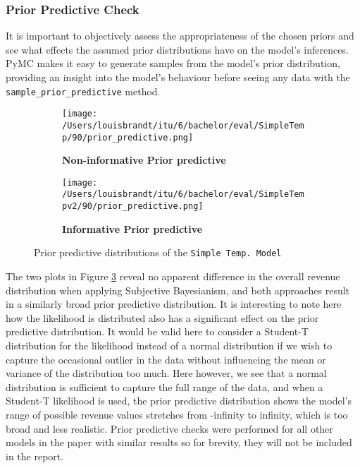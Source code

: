 \subsubsection{Prior Predictive Check}
It is important to objectively assess the appropriateness of the chosen priors
and see what effects the assumed prior distributions have on the model's
inferences. PyMC makes it easy to generate samples from the model's prior 
distribution, providing an insight into the model's behaviour before seeing any data with 
the \texttt{sample\_prior\_predictive} method. 
\begin{figure}[h]
  \centering
  \begin{subfigure}[b]{0.45\textwidth}
    \centering
    \texttt{[image: /Users/louisbrandt/itu/6/bachelor/eval/SimpleTemp/90/prior\_predictive.png]}
    \caption{\textbf{Non-informative Prior predictive}}
    \label{fig:temp_model_prior_predictive_non_informative}
  \end{subfigure}
  \hfill
  \begin{subfigure}[b]{0.45\textwidth}
    \centering
    \texttt{[image: /Users/louisbrandt/itu/6/bachelor/eval/SimpleTempv2/90/prior\_predictive.png]}
    \caption{\textbf{Informative Prior predictive}}
    \label{fig:temp_model_prior_predictive_informative}
  \end{subfigure}
  \caption{Prior predictive distributions of the \texttt{Simple Temp.\ Model}}
  \label{fig:temp_model_prior_predictive}
\end{figure}
The two plots in Figure \ref{fig:temp_model_prior_predictive} reveal no apparent
difference in the overall revenue distribution when applying Subjective
Bayesianism, and both approaches result in a similarly broad prior predictive
distribution. It is interesting to note here how the 
likelihood is distributed also has a significant effect on the prior predictive
distribution. It would be valid here to consider a Student-T distribution for
the likelihood instead of a normal distribution if we wish to capture the
occasional outlier in the data without influencing the mean or variance of the
distribution too much. Here however, we see that a normal distribution is
sufficient to capture the full range of the data, and when a Student-T
likelihood is used, the prior predictive distribution shows the 
model's range of possible revenue values stretches from -infinity to infinity,
which is too broad and less realistic. 
Prior predictive checks were performed for all other models in the paper with
similar results so for brevity, they will not be included in the report.

